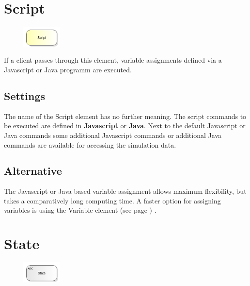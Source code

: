 \section{Script}
\label{ref:ModelElementSetJS}

\begin{figure}
\vspace{-22pt}
\includegraphics[width=2cm]{imageModelElementSetJS.png}
\vspace{-22pt}
\end{figure}

If a client passes through this element, variable assignments defined via
a Javascript or Java programm are executed.

\subsection*{Settings}

The name of the Script element has no further meaning.
The script commands to be executed are defined in \textbf{Javascript} or \textbf{Java}.
Next to the default Javascript or Java commands some additional Javascript commands 
or additional Java commands are available for accessing the simulation data.

\subsection*{Alternative}

The Javascript or Java based variable assignment allows maximum flexibility, but takes a comparatively long
computing time. A faster option for assigning variables is using the
Variable element (see page \pageref{ref:ModelElementSet}) .


\section{State}
\label{ref:ModelElementStateStatistics}

\begin{figure}
\vspace{-22pt}
\includegraphics[width=2cm]{imageModelElementStateStatistics.png}
\vspace{-22pt}
\end{figure}

